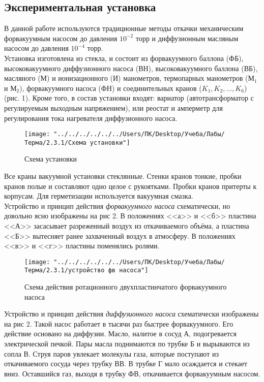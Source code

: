 \documentclass[12pt,a4paper]{article}
\begin{document}
\subsection*{Экспериментальная установка}
 В данной работе используются традиционные методы откачки механическим форвакуумным насосом до давления $10^{-2}$ торр и диффузионным масляным насосом до давления $10^{-4}$ торр. \\
 	Установка изготовлена из стекла,
 и состоит из форвакуумного баллона (ФБ), высоковакуумного диффузионного насоса (ВН), высоковакуумного баллона (ВБ), масляного (М) и ионизационного (И) манометров, термопарных манометров ($\text{М}_1$ и $\text{М}_2$), форвакуумного насоса (ФН) и соединительных кранов ($K_1, K_2,..., K_6$) (рис. 1). Кроме того, в состав установки входят: вариатор
 (автотрансформатор с регулируемым выходным напряжением), или
 реостат и амперметр для регулирования тока нагревателя диффузионного насоса. \\
  \begin{figure}[!h]
 	\centering
 	\texttt{[image: "../../../../../../Users/ПК/Desktop/Учеба/Лабы/Терма/2.3.1/Схема установки"]}
 	\caption[]{Схема установки}
 	\label{fig:Схема установки}
 \end{figure}
 Все краны вакуумной установки стеклянные. Стенки кранов тонкие, пробки кранов полые и составляют одно целое с рукоятками. Пробки кранов притерты к корпусам. Для герметизации используется вакуумная смазка. \\
 Устройство и принцип действия \textit{форвакуумного насоса} схематически, но довольно ясно изображены на рис 2. В положениях <<а>> и <<б>> пластина <<А>> засасывает разреженный воздух из откачиваемого объёма, а пластина <<Б>> вытесняет ранее захваченный воздух в атмосферу. В положениях <<в>> и <<г>> пластины поменялись ролями.
\begin{figure}[!h]
	\centering
	\texttt{[image: "../../../../../../Users/ПК/Desktop/Учеба/Лабы/Терма/2.3.1/устройство фв насоса"]}
	\caption[]{Схема действия ротационного двухпластинчатого форвакуумного насоса}
	\label{fig:Схема ФВ насоса}
\end{figure}
Устройство и принцип действия \textit{диффузионного насоса} схематически изображены на рис 2. Такой насос работает в тысячи раз быстрее форвакуумного. Его действие основано на диффузии. Масло, налитое в сосуд А, подогревается электрической печкой. Пары масла поднимаются по трубке Б и вырываются из сопла В. Струя паров увлекает молекулы газа, которые поступают из откачиваемого сосуда через трубку ВВ. В трубке Г мало осаждается и стекает вниз. Оставшийся газ, выходя в трубку ФВ, откачивается форвакуумным насосом. \\
\end{document}
